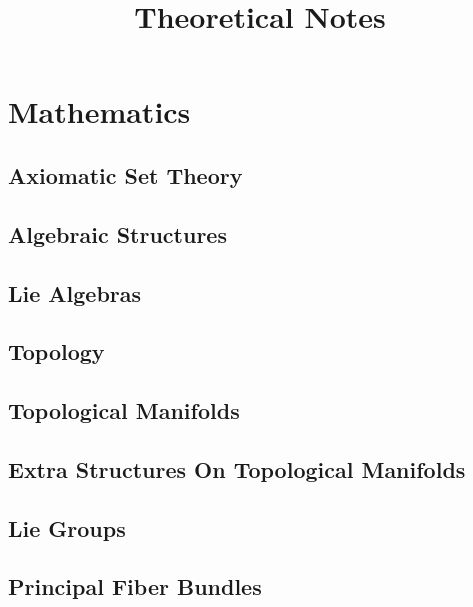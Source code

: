 \documentclass[a4paper, notitlepage]{report}
\begin{document}
\title{Theoretical Notes}
\maketitle
\tableofcontents

\part{Mathematics}

\chapter{Axiomatic Set Theory}


\chapter{Algebraic Structures}


\chapter{Lie Algebras}


\chapter{Topology}


\chapter{Topological Manifolds}


\chapter{Extra Structures On Topological Manifolds}


\chapter{Lie Groups}


\chapter{Principal Fiber Bundles}

\end{document}
